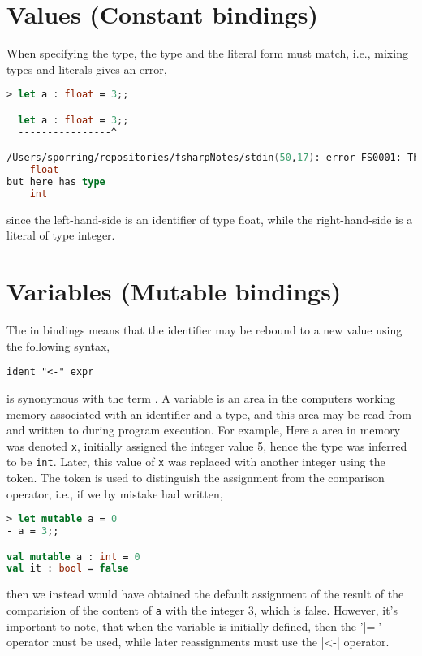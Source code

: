 \section{Values (Constant bindings)}
When specifying the type, the type and the literal form must match, i.e., mixing types and literals gives an error,
%
\begin{lstlisting}[language=fsharp,caption={fsharpi, binding error due to type mismatch.}]
  > let a : float = 3;;

  let a : float = 3;;
  ----------------^

/Users/sporring/repositories/fsharpNotes/stdin(50,17): error FS0001: This expression was expected to have type
    float    
but here has type
    int    
\end{lstlisting}
since the left-hand-side is an identifier of type float, while the right-hand-side is a literal of type integer.

\section{Variables (Mutable bindings)}
\label{sec:mutableValues}
The  in  bindings means that the identifier may be rebound to a new value using the following syntax,
%
\begin{lstlisting}[language=EBNF]
ident "<-" expr
\end{lstlisting}
 is synonymous with the term . A variable is an area in the computers working memory associated with an identifier and a type, and this area may be read from and written to during program execution. For example,
%
%
Here a area in memory was denoted \texttt{x}, initially assigned the integer value 5, hence the type was inferred to be \lstinline|int|.  Later, this value of \texttt{x} was replaced with another integer using the \idx{\token{<-}} token. The \token{<-} token is used to distinguish the assignment from the comparison operator, i.e., if we by mistake had written,
%
\begin{lstlisting}[language=fsharp,caption={fsharpi, example of changing the content of a variable.}]
> let mutable a = 0
- a = 3;;

val mutable a : int = 0
val it : bool = false
\end{lstlisting}
%
then we instead would have obtained the default assignment of the result of the comparision of the content of \lstinline|a| with the integer 3, which is false. However, it's important to note, that when the variable is initially defined, then the '\token|=|' operator must be used, while later reassignments must use the \token|<-|  operator. 

